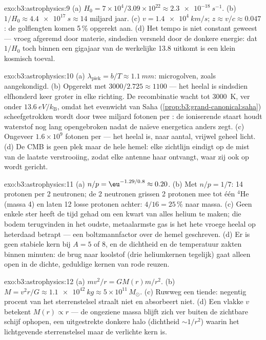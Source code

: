 \begin{solution}{exo:b3:astrophysics:9}
(a) $H_0 = 7\times10^4/3.09\times10^{22} \approx
\qty{2.3e-18}{s^{-1}}$. (b) $1/H_0 \approx \qty{4.4e17}{s}
\approx 14$ miljard jaar. (c) $v = \qty{1.4e4}{km/s}$;
$z \approx v/c \approx 0.047$: de golflengten komen 5\,\% opgerekt
aan. (d) Het tempo is niet constant geweest --- vroeg afgeremd door
materie, sindsdien versneld door de donkere energie: dat
$1/H_0$ toch binnen een gigajaar van de werkelijke 13.8 uitkomt is een
klein kosmisch toeval.
\end{solution}

\begin{solution}{exo:b3:astrophysics:10}
(a) $\lambda_{\text{piek}} = b/T \approx \qty{1.1}{mm}$:
microgolven, zoals aangekondigd. (b) Opgerekt met $3000/2.725 \approx
1100$ --- het heelal is sindsdien elfhonderd keer groter in elke
richting. De recombinatie wacht tot \qty{3000}{K}, ver
onder $\qty{13.6}{eV}/k_{\text{B}}$, omdat het evenwicht van Saha
(\cref{prop:b3:grand-canonical:saha}) scheefgetrokken wordt door twee miljard
fotonen per : de ioniserende staart houdt waterstof nog lang
opengebroken nadat de naïeve energetica anders zegt. (c) Ongeveer
$1.6\times10^{9}$ fotonen per  --- het heelal is, naar
aantal, vrijwel geheel licht. (d) De CMB is geen plek maar
de hele hemel: elke zichtlijn eindigt op de mist van de laatste verstrooiing,
zodat elke antenne haar ontvangt, waar zij ook op wordt gericht.
\end{solution}

\begin{solution}{exo:b3:astrophysics:11}
(a) $n/p = \eu^{-1.29/0.8} \approx 0.20$. (b) Met $n/p = 1/7$:
14 protonen per 2 neutronen; de 2 neutronen grissen 2 protonen mee tot
één $^4$He (massa 4) en laten 12 losse protonen achter: $4/16 = 25\,\%$ naar
massa. (c) Geen enkele ster heeft de tijd gehad om een kwart van alles
helium te maken; die bodem terugvinden in het oudste, metaalarmste gas
is het hete vroege heelal op heterdaad betrapt --- een boltzmannfactor
over de hemel geschreven. (d) Er is geen stabiele kern
bij $A = 5$ of $8$, en de dichtheid en de temperatuur
zakten binnen minuten: de brug naar koolstof (drie heliumkernen
tegelijk) gaat alleen open in de dichte, geduldige kernen van rode reuzen.
\end{solution}

\begin{solution}{exo:b3:astrophysics:12}
(a) $mv^2/r = GM(r)m/r^2$. (b) $M = v^2r/G \approx
\qty{1.1e42}{kg} \approx 5\times10^{11}\,M_\odot$. (c) Ruwweg
een tiende: negentig procent van het sterrenstelsel straalt niet en
absorbeert niet. (d) Een vlakke $v$ betekent $M(r) \propto r$ --- de ongeziene
massa blijft zich ver buiten de zichtbare schijf ophopen, een
uitgestrekte donkere halo (dichtheid $\sim1/r^2$) waarin het lichtgevende
sterrenstelsel maar de verlichte kern is.
\end{solution}

